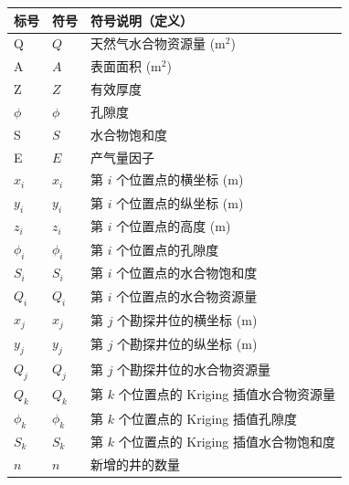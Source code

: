 \documentclass[12pt,a4paper]{nmmcm}
\newcommand{\headcol}{\rowcolor{tableheadcolor}}
\begin{document}
\begin{table}[h!]
  \centering
  \small
  \begin{tabular}{p{60pt}<{\centering}|p{60pt}<{\centering}p{220pt}<{\raggedright}}
    \hline
    \headcol 标号 & 符号       & 符号说明（定义）                     \\
    \hline
    Q           & $Q$      & 天然气水合物资源量 (m$^2$)            \\
    A           & $A$      & 表面面积   (m$^2$)               \\
    Z           & $Z$      & 有效厚度                         \\
    $\phi$      & $\phi$   & 孔隙度                          \\
    S           & $S$      & 水合物饱和度                       \\
    E           & $E$      & 产气量因子                        \\
    $x_i$       & $x_i$    & 第 $i$ 个位置点的横坐标   (m)         \\
    $y_i$       & $y_i$    & 第 $i$ 个位置点的纵坐标   (m)         \\
    $z_i$       & $z_i$    & 第 $i$ 个位置点的高度   (m)          \\
    $\phi_i$    & $\phi_i$ & 第 $i$ 个位置点的孔隙度               \\
    $S_i$       & $S_i$    & 第 $i$ 个位置点的水合物饱和度            \\
    $Q_i$       & $Q_i$    & 第 $i$ 个位置点的水合物资源量            \\
    $x_j$       & $x_j$    & 第 $j$ 个勘探井位的横坐标   (m)        \\
    $y_j$       & $y_j$    & 第 $j$ 个勘探井位的纵坐标   (m)        \\
    $Q_j$       & $Q_j$    & 第 $j$ 个勘探井位的水合物资源量           \\
    $Q_k$       & $Q_k$    & 第 $k$ 个位置点的 Kriging 插值水合物资源量 \\
    $\phi_k$    & $\phi_k$ & 第 $k$ 个位置点的 Kriging 插值孔隙度    \\
    $S_k$       & $S_k$    & 第 $k$ 个位置点的 Kriging 插值水合物饱和度 \\
    $ n$        & $n$      & 新增的井的数量                      \\

    \hline
    \hline
  \end{tabular}
  \label{tab:symbol}
\end{table}
\end{document}
